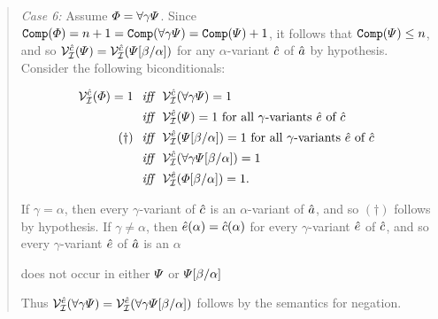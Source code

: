 \begin{quote}
  \textit{Case 6:} Assume $\varPhi=\forall \gamma\varPsi$.
  Since $\texttt{Comp}(\varPhi)=n+1=\texttt{Comp}(\forall \gamma\varPsi)=\texttt{Comp}(\varPsi)+1$, it follows that $\texttt{Comp}(\varPsi)\leq n$, and so $\mathcal{V}_{\mathcal{I}}^{\hat{c}}(\varPsi)=\mathcal{V}_{\mathcal{I}}^{\hat{c}}(\varPsi[\beta/\alpha])$ for any $\alpha$-variant $\hat{c}$ of $\hat{a}$ by hypothesis.
  Consider the following biconditionals:

  \vspace{-.2in}
  \begin{align*}
    \mathcal{V}_{\mathcal{I}}^{\hat{c}}(\varPhi)=1 &\textit{ ~iff~ } \mathcal{V}_{\mathcal{I}}^{\hat{c}}(\forall \gamma\varPsi)=1\\
      &\textit{ ~iff~ } \mathcal{V}_{\mathcal{I}}^{\hat{e}}(\varPsi)=1 \text{ for all } \gamma\text{-variants } \hat{e} \text{ of } \hat{c}\\ 
      (\dagger) &\textit{ ~iff~ } \mathcal{V}_{\mathcal{I}}^{\hat{e}}(\varPsi[\beta/\alpha])=1 \text{ for all } \gamma\text{-variants } \hat{e} \text{ of } \hat{c}\\  
      &\textit{ ~iff~ } \mathcal{V}_{\mathcal{I}}^{\hat{c}}(\forall \gamma\varPsi[\beta/\alpha])=1\\ 
      &\textit{ ~iff~ } \mathcal{V}_{\mathcal{I}}^{\hat{e}}(\varPhi[\beta/\alpha])=1.
  \end{align*}

  If $\gamma=\alpha$, then every $\gamma$-variant of $\hat{c}$ is an $\alpha$-variant of $\hat{a}$, and so $(\dagger)$ follows by hypothesis. 
  If $\gamma\neq\alpha$, then $\hat{e}(\alpha)=\hat{c}(\alpha)$ for every $\gamma$-variant $\hat{e}$ of $\hat{c}$, and so every $\gamma$-variant $\hat{e}$ of $\hat{a}$ is an $\alpha$

  does not occur in either $\varPsi$ or $\varPsi[\beta/\alpha]$

  Thus $\mathcal{V}_{\mathcal{I}}^{\hat{e}}(\forall \gamma\varPsi)=\mathcal{V}_{\mathcal{I}}^{\hat{e}}(\forall \gamma\varPsi[\beta/\alpha])$ follows by the semantics for negation. 

\end{quote}


\label{box:Lemma6} %

\label{box:Lemma7} %


